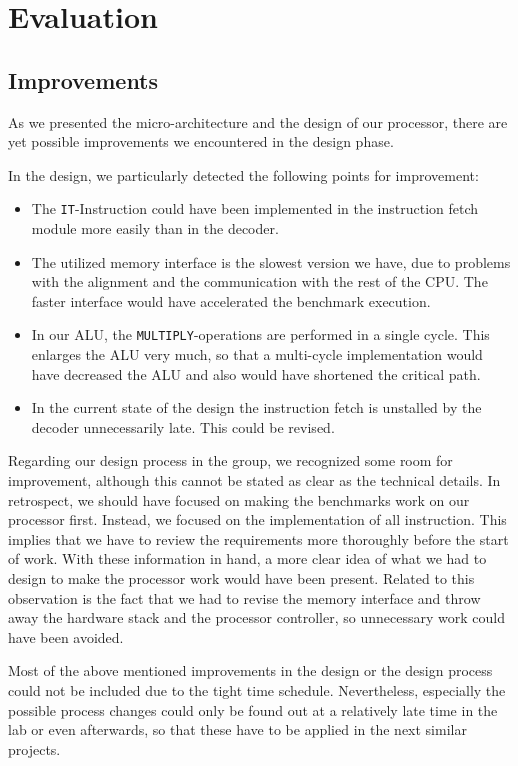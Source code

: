 \chapter{Evaluation}
\label{cha:evaluation}

\section{Improvements}
\label{sec:improvements}
As we presented the micro-architecture and the design of our processor, there are yet possible improvements we encountered in the design phase. 

In the design, we particularly detected the following points for improvement:
\begin{itemize}
\item The \texttt{IT}-Instruction could have been implemented in the instruction fetch module more easily than in the decoder.
\item The utilized memory interface is the slowest version we have, due to problems with the alignment and the communication with the rest of the CPU. The faster interface would have accelerated the benchmark execution.
\item In our ALU, the \texttt{MULTIPLY}-operations are performed in a single cycle. This enlarges the ALU very much, so that a multi-cycle implementation would have decreased the ALU and also would have shortened the critical path.
\item In the current state of the design the instruction fetch is unstalled by the decoder unnecessarily late. This could be revised.
\end{itemize}

Regarding our design process in the group, we recognized some room for improvement, although this cannot be stated as clear as the technical details. In retrospect, we should have focused on making the benchmarks work on our processor first. Instead, we focused on the implementation of all instruction. This implies that we have to review the requirements more thoroughly before the start of work. With these information in hand, a more clear idea of what we had to design to make the processor work would have been present. Related to this observation is the fact that we had to revise the memory interface and throw away the hardware stack and the processor controller, so unnecessary work could have been avoided.
 
Most of the above mentioned improvements in the design or the design process could not be included due to the tight time schedule. Nevertheless, especially the possible process changes could only be found out at a relatively late time in the lab or even afterwards, so that these have to be applied in the next similar projects.

